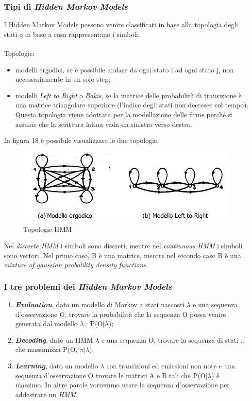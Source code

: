 \subsubsection*{Tipi di \emph{Hidden Markov Models}}
\label{3.3.2.4}
I Hidden Markov Models possono venire classificati in base alla topologia degli stati o in base a cosa rappresentano i simboli.\\\\
Topologie:
\begin{itemize}
\item modelli ergodici, se è possibile andare da ogni stato i ad ogni stato j, non necessariamente in un solo step;
\item modelli \emph{Left to Right} o \emph{Bakis}, se la matrice delle probabilità di transizione è una matrice triangolare superiore (l'indice degli stati non decresce col tempo). Questa topologia viene adottata per la modellazione delle firme perché si assume che la scrittura latina vada da sinistra verso destra.
\end{itemize}
In figura 18 è possibile visualizzare le due topologie.
\begin{figure}[H]
\centering
\includegraphics[scale=0.7]{../capitolo3img/topologie.png}
\caption{Topologie HMM}
\end{figure}
Nel \emph{discrete HMM} i simboli sono discreti, mentre nel \emph{continuous HMM} i simboli sono vettori. Nel primo caso, B è una matrice, mentre nel secondo caso B è una \emph{mixture of gaussian probalility density functions}.

\subsubsection*{I tre problemi dei \emph{Hidden Markov Models}\cite{8}}
\label{3.3.2.5}
\begin{enumerate}
\item\textbf{\emph{Evaluation}}, dato un modello di Markov a stati nascosti $\lambda$ e una sequenza d'osservazione O, trovare la probabilità che la sequenza O possa venire generata dal modello $\lambda$ : P(O$|\lambda$);
\item\textbf{\emph{Decoding}}, dato un HMM $\lambda$ e una sequenza O, trovare la sequenza di stati $\pi$ che massimizza P(O, $\pi$$|\lambda$);
\item\textbf{\emph{Learning}}, dato un modello $\lambda$ con transizioni ed emissioni non note e una sequenza d'osservazione O trovare le matrici A e B tali che P(O$|\lambda$) è massimo. In altre parole vorremmo usare la sequenza d'osservazione per addestrare un \emph{HMM}.
\end{enumerate}

